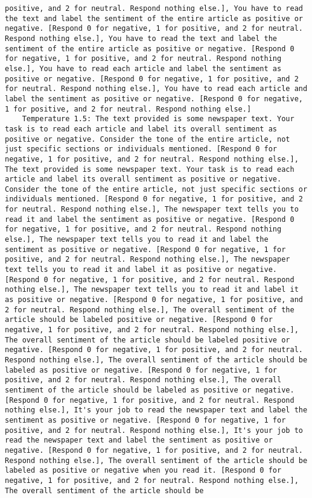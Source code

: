 \begin{lstlisting}[label=lst:poor_performing_prompts]
positive, and 2 for neutral. Respond nothing else.], You have to read the text and label the sentiment of the entire article as positive or negative. [Respond 0 for negative, 1 for positive, and 2 for neutral. Respond nothing else.], You have to read the text and label the sentiment of the entire article as positive or negative. [Respond 0 for negative, 1 for positive, and 2 for neutral. Respond nothing else.], You have to read each article and label the sentiment as positive or negative. [Respond 0 for negative, 1 for positive, and 2 for neutral. Respond nothing else.], You have to read each article and label the sentiment as positive or negative. [Respond 0 for negative, 1 for positive, and 2 for neutral. Respond nothing else.]
	Temperature 1.5: The text provided is some newspaper text. Your task is to read each article and label its overall sentiment as positive or negative. Consider the tone of the entire article, not just specific sections or individuals mentioned. [Respond 0 for negative, 1 for positive, and 2 for neutral. Respond nothing else.], The text provided is some newspaper text. Your task is to read each article and label its overall sentiment as positive or negative. Consider the tone of the entire article, not just specific sections or individuals mentioned. [Respond 0 for negative, 1 for positive, and 2 for neutral. Respond nothing else.], The newspaper text tells you to read it and label the sentiment as positive or negative. [Respond 0 for negative, 1 for positive, and 2 for neutral. Respond nothing else.], The newspaper text tells you to read it and label the sentiment as positive or negative. [Respond 0 for negative, 1 for positive, and 2 for neutral. Respond nothing else.], The newspaper text tells you to read it and label it as positive or negative. [Respond 0 for negative, 1 for positive, and 2 for neutral. Respond nothing else.], The newspaper text tells you to read it and label it as positive or negative. [Respond 0 for negative, 1 for positive, and 2 for neutral. Respond nothing else.], The overall sentiment of the article should be labeled positive or negative. [Respond 0 for negative, 1 for positive, and 2 for neutral. Respond nothing else.], The overall sentiment of the article should be labeled positive or negative. [Respond 0 for negative, 1 for positive, and 2 for neutral. Respond nothing else.], The overall sentiment of the article should be labeled as positive or negative. [Respond 0 for negative, 1 for positive, and 2 for neutral. Respond nothing else.], The overall sentiment of the article should be labeled as positive or negative. [Respond 0 for negative, 1 for positive, and 2 for neutral. Respond nothing else.], It's your job to read the newspaper text and label the sentiment as positive or negative. [Respond 0 for negative, 1 for positive, and 2 for neutral. Respond nothing else.], It's your job to read the newspaper text and label the sentiment as positive or negative. [Respond 0 for negative, 1 for positive, and 2 for neutral. Respond nothing else.], The overall sentiment of the article should be labeled as positive or negative when you read it. [Respond 0 for negative, 1 for positive, and 2 for neutral. Respond nothing else.], The overall sentiment of the article should be 
\end{lstlisting}

